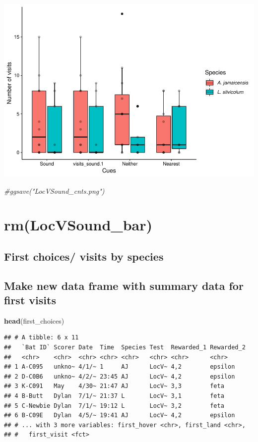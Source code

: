 \documentclass[]{article}
\newenvironment{Shaded}{\begin{snugshade}}{\end{snugshade}}
\newcommand{\KeywordTok}[1]{\textcolor[rgb]{0.13,0.29,0.53}{\textbf{{#1}}}}
\newcommand{\CommentTok}[1]{\textcolor[rgb]{0.56,0.35,0.01}{\textit{{#1}}}}
\newcommand{\NormalTok}[1]{{#1}}
\begin{document}
\includegraphics{Sensory_learning_files/figure-latex/unnamed-chunk-22-1.pdf}

\begin{Shaded}
\begin{Highlighting}[]
\CommentTok{#ggsave("LocVSound_cnts.png")}
\end{Highlighting}
\end{Shaded}

\section{rm(LocVSound\_bar)}\label{rmlocvsound_bar}

\subsection{First choices/ visits by
species}\label{first-choices-visits-by-species}

\subsection{Make new data frame with summary data for first
visits}\label{make-new-data-frame-with-summary-data-for-first-visits}

\begin{Shaded}
\begin{Highlighting}[]
\KeywordTok{head}\NormalTok{(first_choices)}
\end{Highlighting}
\end{Shaded}

\begin{verbatim}
## # A tibble: 6 x 11
##   `Bat ID` Scorer Date  Time  Species Test  Rewarded_1 Rewarded_2
##   <chr>    <chr>  <chr> <chr> <chr>   <chr> <chr>      <chr>     
## 1 A-C095   unkno~ 4/1/~ 1     AJ      LocV~ 4,2        epsilon   
## 2 D-C0B6   unkno~ 4/2/~ 23:45 AJ      LocV~ 4,2        epsilon   
## 3 K-C091   May    4/30~ 21:47 AJ      LocV~ 3,3        feta      
## 4 B-Butt   Dylan  7/1/~ 21:37 L       LocV~ 3,1        feta      
## 5 C-Newbie Dylan  7/1/~ 19:12 L       LocV~ 3,2        feta      
## 6 B-C09E   Dylan  4/5/~ 19:41 AJ      LocV~ 4,2        epsilon   
## # ... with 3 more variables: first_hover <chr>, first_land <chr>,
## #   first_visit <fct>
\end{verbatim}
\end{document}
